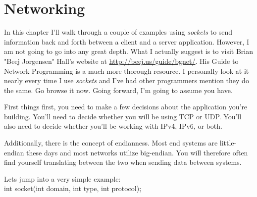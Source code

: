 \documentclass[../main.tex]{subfiles}
\begin{document}
	\chapter{Networking}\label{ch:networking}
	In this chapter I'll walk through a couple of examples using \textit{sockets} to send information back and forth between a client and a server application.  However, I am not going to go into any great depth.  What I actually suggest is to visit Brian "Beej Jorgensen" Hall's website at \url{http://beej.us/guide/bgnet/}.  His Guide to Network Programming \cite{beej_network_programming} is a much more thorough resource.  I personally look at it nearly every time I use \textit{sockets} and I've had other programmers mention they do the same. Go browse it now.  Going forward, I'm going to assume you have.
	
	First things first, you need to make a few decisions about the application you're building.  You'll need to decide whether you will be using TCP or UDP. You'll also need to decide whether you'll be working with IPv4, IPv6, or both.
	
	Additionally, there is the concept of endianness.  Most end systems are little-endian these days and most networks utilize big-endian.  You will therefore often find yourself translating between the two when sending data between systems.
	
	Lets jump into a very simple example: \\
	
	       int socket(int domain, int type, int protocol);
	
\end{document}
